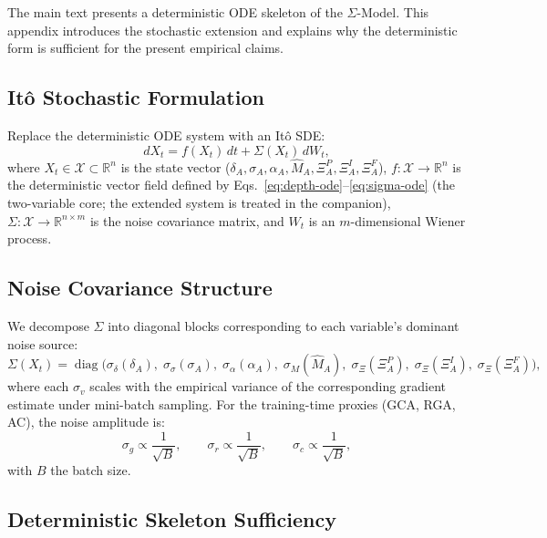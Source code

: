 The main text presents a deterministic ODE skeleton of the $\Sigma$-Model.
This appendix introduces the stochastic extension and explains why the
deterministic form is sufficient for the present empirical claims.

\subsection{It\^o Stochastic Formulation}

Replace the deterministic ODE system with an It\^o SDE:
\begin{equation}\label{eq:sde-full}
dX_t = f(X_t)\,dt + \Sigma(X_t)\,dW_t,
\end{equation}
where $X_t \in \mathcal{X} \subset \mathbb{R}^n$ is the state vector
($\delta_A, \sigma_A, \alpha_A, \hat{M}_A, \Xi_A^P, \Xi_A^I, \Xi_A^F$),
$f: \mathcal{X} \to \mathbb{R}^n$ is the deterministic vector field
defined by Eqs.~\eqref{eq:depth-ode}--\eqref{eq:sigma-ode} (the
two-variable core; the extended system is treated in the companion),
$\Sigma: \mathcal{X} \to \mathbb{R}^{n \times m}$ is the noise
covariance matrix, and $W_t$ is an $m$-dimensional Wiener process.

\subsection{Noise Covariance Structure}

We decompose $\Sigma$ into diagonal blocks corresponding to each variable's
dominant noise source:
\begin{equation}
\Sigma(X_t) = \operatorname{diag}\bigl(
\sigma_\delta(\delta_A),\; \sigma_\sigma(\sigma_A),\;
\sigma_\alpha(\alpha_A),\;\sigma_M(\hat{M}_A),\;
\sigma_\Xi(\Xi_A^P),\;\sigma_\Xi(\Xi_A^I),\;\sigma_\Xi(\Xi_A^F)
\bigr),
\end{equation}
where each $\sigma_v$ scales with the empirical variance of the
corresponding gradient estimate under mini-batch sampling. For the
training-time proxies (GCA, RGA, AC), the noise amplitude is:
\begin{equation}
\sigma_g \propto \frac{1}{\sqrt{B}}, \qquad
\sigma_r \propto \frac{1}{\sqrt{B}}, \qquad
\sigma_c \propto \frac{1}{\sqrt{B}},
\end{equation}
with $B$ the batch size.

\subsection{Deterministic Skeleton Sufficiency}

